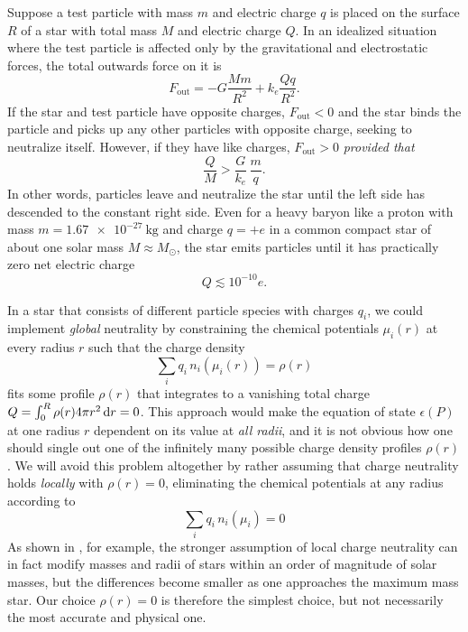 Suppose a test particle with mass $m$ and electric charge $q$
is placed on the surface $R$ of a star with total mass $M$ and electric charge $Q$.
In an idealized situation where the test particle is affected only by the gravitational and electrostatic forces,
the total outwards force on it is
\begin{equation}
F_\text{out} = -G \frac{M m}{R^2} + k_e \frac{Q q}{R^2} .
\end{equation}
If the star and test particle have opposite charges, $F_\text{out} < 0$ and the star binds the particle and picks up any other particles with opposite charge, seeking to neutralize itself.
However, if they have like charges, $F_\text{out} > 0$ \emph{provided that}
\begin{equation}
\frac{Q}{M} > \frac{G}{k_e} \, \frac{m}{q}.
\end{equation}
In other words, particles leave and neutralize the star until the left side has descended to the constant right side.
Even for a heavy baryon like a proton with mass $m = \SI{1.67e-27}{\kilogram}$ and charge $q = +e$ in a common compact star of about one solar mass $M \approx M_\odot$,
the star emits particles until it has practically zero net electric charge
\begin{equation}
Q \lesssim 10^{-10} e .
\end{equation}

In a star that consists of different particle species with charges $q_i$,
we could implement \emph{global} neutrality by constraining the chemical potentials $\mu_i(r)$ at every radius $r$ such that the charge density
\begin{equation}
	\sum_i q_i \, n_i(\mu_i(r)) = \rho(r)
\label{eq:intro:charge_neutrality_global}
\end{equation}
fits some profile $\rho(r)$ that
integrates to a vanishing total charge $Q = \int_0^R \rho(r) 4 \pi r^2 \mathop{}\!\mathrm{d} r = 0$.
This approach would make the equation of state $\epsilon(P)$ at one radius $r$ dependent on its value at \emph{all radii},
and it is not obvious how one should single out one of the infinitely many possible charge density profiles $\rho(r)$.
We will avoid this problem altogether by rather assuming that charge neutrality holds \emph{locally} with $\rho(r) = 0$,
eliminating the chemical potentials at any radius according to
\begin{equation}
	\sum_i q_i \, n_i(\mu_i) = 0
\label{eq:lsm:charge_neutrality}
\end{equation}
As shown in \cite{ref:global_neutrality}, for example, the stronger assumption of local charge neutrality can in fact modify masses and radii of stars within an order of magnitude of solar masses,
but the differences become smaller as one approaches the maximum mass star.
Our choice $\rho(r)=0$ is therefore the simplest choice, but not necessarily the most accurate and physical one.

